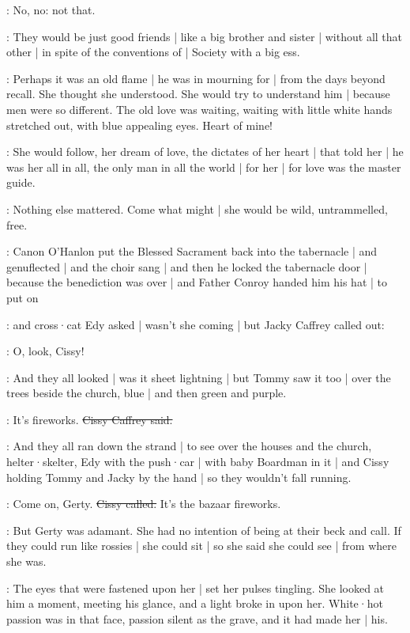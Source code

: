 \gertyJudgy:
No,
no:
not that.

\gertyRomantic:
They would be just good friends |
like a big brother and sister |
without all that other |
in spite of the conventions of |
Society with a big ess.

\gertyNovel:
Perhaps it was an old flame |
he was in mourning for |
from the days beyond recall.
She thought she understood.
She would try to understand him |
because men were so different.
The old love was waiting,
waiting with little white hands stretched out,
with blue appealing eyes.%
Heart of mine!

\gertyRomantic:
She would follow,
her dream of love,
the dictates of her heart |
that told her |
he was her all in all,
the only man in all the world |
for her |
for love was the master guide.

\gertySex:
Nothing else mattered.
Come what might |
she would be wild,
untrammelled,
free.

\Nrelig:
Canon O'Hanlon
put the Blessed Sacrament
back into the tabernacle |
and genuflected |
and the choir sang  |
and then he locked the tabernacle door |
because the benediction was over |
and Father Conroy handed him his hat |
to put on

:
and cross·cat Edy asked |
wasn't she coming |
but Jacky Caffrey called out:

\jacky:
O,
look,
Cissy!

:
And they all looked |
was it sheet lightning |%
but Tommy saw it too |
over the trees beside the church,
blue |
and then green
and purple.

\cissy:
It's fireworks.
\sout{Cissy Caffrey said.}

:
And they all ran down the strand |
to see over the houses
and the church,
helter·skelter,
Edy with the push·car |
with baby Boardman in it |
and Cissy holding Tommy and Jacky by the hand |
so they wouldn't fall running.

\cissy:
Come on,
Gerty.
\sout{Cissy called.}
It's the bazaar fireworks.

\gertyReal:
But Gerty was adamant.
She had no intention
of being at their beck and call.
If they could run like rossies |
she could sit |
so she said she could see |
from where she was.

\gertySex:
The eyes that were fastened upon her |
set her pulses tingling.%
She looked at him a moment,
meeting his glance,
and a light broke in upon her.
White·hot passion was in that face,
passion silent as the grave,
and it had made her |
his.

